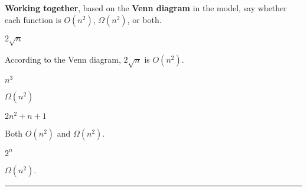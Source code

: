 \documentclass{tufte-handout}
\begin{document}
\begin{questions}
\item \textbf{Working together}, based on the \textbf{Venn diagram} in
  the model, say whether each function is $O(n^2)$, $\Omega(n^2)$, or
  both. 
  \begin{subquestions}
  \item $2\sqrt n$
    \begin{answer}According to the Venn diagram, $2\sqrt n$ is $O(n^2)$.\end{answer}
  \item $n^3$
    \begin{answer}$\Omega(n^2)$\end{answer}
  \item $2n^2 + n + 1$
    \begin{answer}Both $O(n^2)$ and $\Omega(n^2)$.\end{answer}
  \item $2^n$
    \begin{answer}$\Omega(n^2)$.\end{answer}
  \end{subquestions}
\end{questions}

\hrule \bigskip
\end{document}
